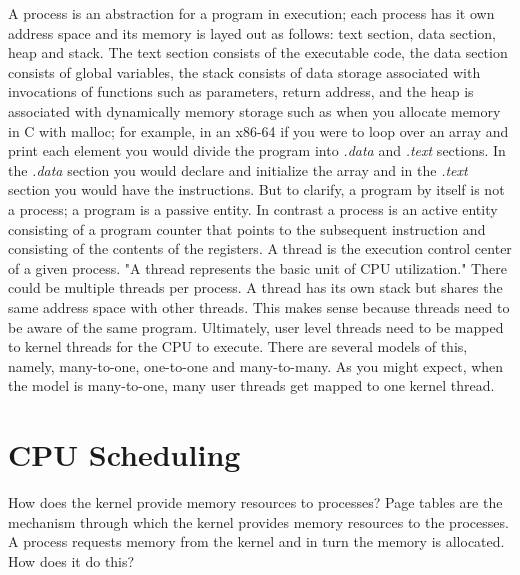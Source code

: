 \documentclass{amsbook}
\begin{document}
A process is an abstraction for a program in execution; each process has it own address space and its memory is layed out as follows: text section, data section, heap and stack. The text section consists of the executable code, the data section consists of global variables, the stack consists of data storage associated with invocations of functions such as parameters, return address, and the heap is associated with dynamically memory storage such as when you allocate memory in C with malloc; for example, in an x86-64 if you were to loop over an array and print each element you would divide the program into \textit{.data} and \textit{.text} sections. In the \textit{.data} section you would declare and initialize the array and in the \textit{.text} section you would have the instructions. But to clarify, a program by itself is not a process; a program is a passive entity. In contrast a process is an active entity consisting of a program counter that points to the subsequent instruction and consisting of the contents of the registers. A thread is the execution control center of a given process. "A thread represents the basic unit of CPU utilization." There could be multiple threads per process. A thread has its own stack but shares the same address space with other threads. This makes sense because threads need to be aware of the same program. Ultimately, user level threads need to be mapped to kernel threads for the CPU to execute. There are several models of this, namely, many-to-one, one-to-one and many-to-many. As you might expect, when the model is many-to-one, many user threads get mapped to one kernel thread.

\section{CPU Scheduling}

How does the kernel provide memory resources to processes? Page tables are the mechanism through which the kernel provides memory resources to the processes. A process requests memory from the kernel and in turn the memory is allocated. How does it do this? 
\end{document}
